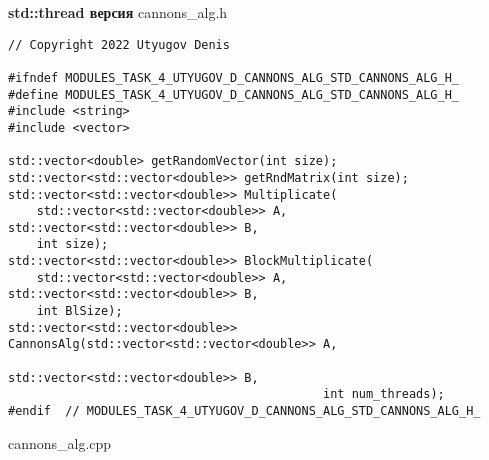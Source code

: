 \documentclass{report}
\begin{document}
\textbf{std::thread версия}
\newline
\newline cannons\_alg.h
\begin{lstlisting}
// Copyright 2022 Utyugov Denis

#ifndef MODULES_TASK_4_UTYUGOV_D_CANNONS_ALG_STD_CANNONS_ALG_H_
#define MODULES_TASK_4_UTYUGOV_D_CANNONS_ALG_STD_CANNONS_ALG_H_
#include <string>
#include <vector>

std::vector<double> getRandomVector(int size);
std::vector<std::vector<double>> getRndMatrix(int size);
std::vector<std::vector<double>> Multiplicate(
    std::vector<std::vector<double>> A, std::vector<std::vector<double>> B,
    int size);
std::vector<std::vector<double>> BlockMultiplicate(
    std::vector<std::vector<double>> A, std::vector<std::vector<double>> B,
    int BlSize);
std::vector<std::vector<double>> CannonsAlg(std::vector<std::vector<double>> A,
                                            std::vector<std::vector<double>> B,
                                            int num_threads);
#endif  // MODULES_TASK_4_UTYUGOV_D_CANNONS_ALG_STD_CANNONS_ALG_H_

\end{lstlisting}
cannons\_alg.cpp
\end{document}
